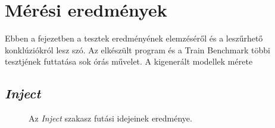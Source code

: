 \chapter{Mérési eredmények}

Ebben a fejezetben a tesztek eredményének elemzéséről és a leszűrhető konklúziókról lesz szó. Az elkészült program és a Train Benchmark többi tesztjének futtatása sok órás művelet. A kigenerált modellek mérete

\section{\emph{Inject}}
\pagebreak
\begin{figure}[H]
	\centering
	\vspace*{-2cm}
	\label{fig:InjectResult}
	\caption{Az \emph{Inject} szakasz futási idejeinek eredménye.}
\end{figure}


